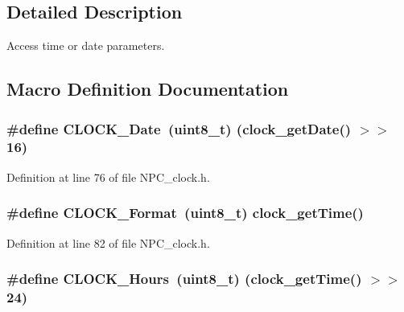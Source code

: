 \subsection{Detailed Description}
Access time or date parameters. 



\subsection{Macro Definition Documentation}
\subsubsection[{\texorpdfstring{C\+L\+O\+C\+K\+\_\+\+Date}{CLOCK_Date}}]{\setlength{\rightskip}{0pt plus 5cm}\#define C\+L\+O\+C\+K\+\_\+\+Date~(uint8\+\_\+t) ({\bf clock\+\_\+get\+Date}() $>$$>$ 16)}\hypertarget{group___c_l_o_c_k___value_ga483cf87b93faab3c148b7933391acba0}{}\label{group___c_l_o_c_k___value_ga483cf87b93faab3c148b7933391acba0}


Definition at line 76 of file N\+P\+C\+\_\+clock.\+h.

\subsubsection[{\texorpdfstring{C\+L\+O\+C\+K\+\_\+\+Format}{CLOCK_Format}}]{\setlength{\rightskip}{0pt plus 5cm}\#define C\+L\+O\+C\+K\+\_\+\+Format~(uint8\+\_\+t) {\bf clock\+\_\+get\+Time}()}\hypertarget{group___c_l_o_c_k___value_gafec8368ed05e06cadccc3becf2cd0ead}{}\label{group___c_l_o_c_k___value_gafec8368ed05e06cadccc3becf2cd0ead}


Definition at line 82 of file N\+P\+C\+\_\+clock.\+h.

\subsubsection[{\texorpdfstring{C\+L\+O\+C\+K\+\_\+\+Hours}{CLOCK_Hours}}]{\setlength{\rightskip}{0pt plus 5cm}\#define C\+L\+O\+C\+K\+\_\+\+Hours~(uint8\+\_\+t) ({\bf clock\+\_\+get\+Time}() $>$$>$ 24)}\hypertarget{group___c_l_o_c_k___value_ga49ea807900604714bab70a531081ac6a}{}\label{group___c_l_o_c_k___value_ga49ea807900604714bab70a531081ac6a}


